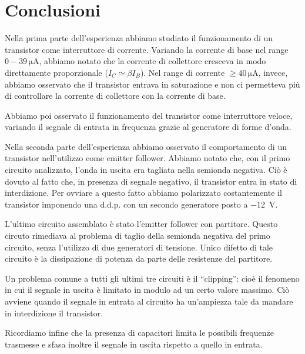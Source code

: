 \section{Conclusioni}

Nella prima parte dell'esperienza abbiamo studiato il funzionamento di un transistor come interruttore di corrente.
Variando la corrente di base nel range $0 - 39\,\si{\micro\ampere}$, abbiamo notato che la corrente di collettore cresceva in modo direttamente proporzionale ($I_C \simeq \beta I_B$).
Nel range di corrente $\geq 40 \,\si{\micro\ampere}$, invece, abbiamo osservato che il transistor entrava in saturazione e non ci permetteva più di controllare la corrente di collettore con la corrente di base.

Abbiamo poi osservato il funzionamento del transistor come interruttore veloce, variando il segnale di entrata in frequenza grazie al generatore di forme d'onda.

Nella seconda parte dell'esperienza abbiamo osservato il comportamento di un transistor nell'utilizzo come emitter follower.
Abbiamo notato che, con il primo circuito analizzato, l'onda in uscita era tagliata nella semionda negativa.
Ciò è dovuto al fatto che, in presenza di segnale negativo, il transistor entra in stato di interdizione.
Per ovviare a questo fatto abbiamo polarizzato costantemente il transistor imponendo una d.d.p. con un secondo generatore posto a \SI{-12}{\volt}.

L'ultimo circuito assemblato è stato l'emitter follower con partitore.
Questo circuto rimediava al problema di taglio della semionda negativa del primo circuito, senza l'utilizzo di due generatori di tensione. Unico difetto di tale circuito è la dissipazione di potenza da parte delle resistenze del partitore.

Un problema comune a tutti gli ultimi tre circuiti è il ``clipping'': cioè il fenomeno in cui il segnale in uscita è limitato in modulo ad un certo valore massimo.
Ciò avviene quando il segnale in entrata al circuito ha un'ampiezza tale da mandare in interdizione il transistor.

Ricordiamo infine che la presenza di capacitori limita le possibili frequenze trasmesse e sfasa inoltre il segnale in uscita rispetto a quello in entrata.